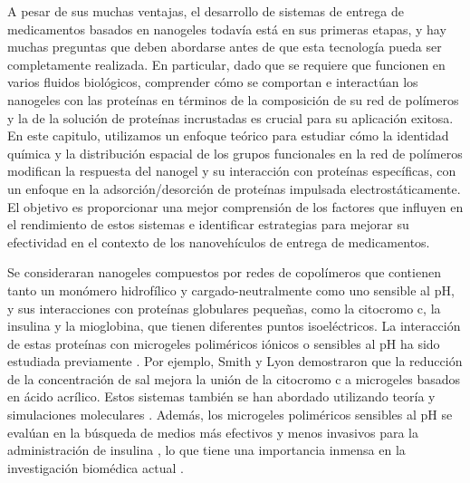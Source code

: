 A pesar de sus muchas ventajas, el desarrollo de sistemas de entrega de medicamentos basados en nanogeles todav\'ia est\'a en sus primeras etapas, y hay muchas preguntas que deben abordarse antes de que esta tecnolog\'ia pueda ser completamente realizada.
En particular, dado que se requiere que funcionen en varios fluidos biol\'ogicos, comprender c\'omo se comportan e interact\'uan los nanogeles con las prote\'inas en t\'erminos de la composici\'on de su red de pol\'imeros y la de la soluci\'on de prote\'inas incrustadas es crucial para su aplicaci\'on exitosa.
En este capitulo, utilizamos un enfoque te\'orico para estudiar c\'omo la identidad qu\'imica y la distribuci\'on espacial de los grupos funcionales en la red de pol\'imeros modifican la respuesta del nanogel y su interacci\'on con prote\'inas espec\'ificas, con un enfoque en la adsorci\'on/desorci\'on de prote\'inas impulsada electrost\'aticamente.
El objetivo es proporcionar una mejor comprensi\'on de los factores que influyen en el rendimiento de estos sistemas e identificar estrategias para mejorar su efectividad en el contexto de los nanoveh\'iculos de entrega de medicamentos.



Se consideraran  nanogeles compuestos por redes de copol\'imeros que contienen tanto un mon\'omero hidrofílico y  cargado-neutralmente como uno sensible al pH, y sus interacciones con prote\'inas globulares peque\~nas, como la citocromo c, la insulina y la mioglobina, que tienen diferentes puntos isoel\'ectricos.
La interacci\'on de estas prote\'inas con microgeles polim\'ericos i\'onicos o sensibles al pH ha sido estudiada previamente \cite{kabanov2009nanogels,smith2011tunable,sharma2022modulating,klinger2011dual}.
Por ejemplo, Smith y Lyon \cite{smith2011tunable} demostraron que la reducci\'on de la concentraci\'on de sal mejora la uni\'on de la citocromo c a microgeles basados en \'acido acr\'ilico.
Estos sistemas tambi\'en se han abordado utilizando teor\'ia y simulaciones moleculares \cite{hagemann2018use,oberle2015competitive}.
Adem\'as, los microgeles polim\'ericos sensibles al pH se eval\'uan en la b\'usqueda de medios m\'as efectivos y menos invasivos para la administraci\'on de insulina \cite{lowman1999oral,wong2018microparticles}, lo que tiene una importancia inmensa en la investigaci\'on biom\'edica actual \cite{chaturvedi2013polymeric} .


